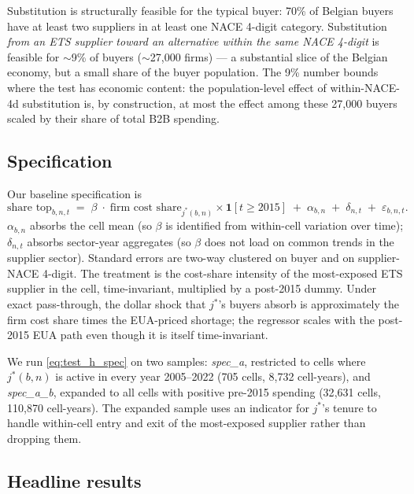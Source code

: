 Substitution is structurally feasible for the typical buyer: 70\% of Belgian buyers have at least two suppliers in at least one NACE 4-digit category. Substitution \emph{from an ETS supplier toward an alternative within the same NACE 4-digit} is feasible for $\sim$9\% of buyers ($\sim$27{,}000 firms) --- a substantial slice of the Belgian economy, but a small share of the buyer population. The 9\% number bounds where the test has economic content: the population-level effect of within-NACE-4d substitution is, by construction, at most the effect among these 27{,}000 buyers scaled by their share of total B2B spending.

\subsection{Specification}

Our baseline specification is
\begin{equation}
    \text{share top}_{b,n,t} \;=\; \beta\;\cdot\;\text{firm cost share}_{j^*(b,n)} \times \mathbf{1}[t \geq 2015] \;+\; \alpha_{b,n} \;+\; \delta_{n,t} \;+\; \varepsilon_{b,n,t}.
    \label{eq:test_h_spec}
\end{equation}
$\alpha_{b,n}$ absorbs the cell mean (so $\beta$ is identified from within-cell variation over time); $\delta_{n,t}$ absorbs sector-year aggregates (so $\beta$ does not load on common trends in the supplier sector). Standard errors are two-way clustered on buyer and on supplier-NACE 4-digit. The treatment is the cost-share intensity of the most-exposed ETS supplier in the cell, time-invariant, multiplied by a post-2015 dummy. Under exact pass-through, the dollar shock that $j^*$'s buyers absorb is approximately the firm cost share times the EUA-priced shortage; the regressor scales with the post-2015 EUA path even though it is itself time-invariant.

We run \eqref{eq:test_h_spec} on two samples: \emph{spec\_a}, restricted to cells where $j^*(b,n)$ is active in every year 2005--2022 (705 cells, 8{,}732 cell-years), and \emph{spec\_a\_b}, expanded to all cells with positive pre-2015 spending (32{,}631 cells, 110{,}870 cell-years). The expanded sample uses an indicator for $j^*$'s tenure to handle within-cell entry and exit of the most-exposed supplier rather than dropping them.

\subsection{Headline results}

